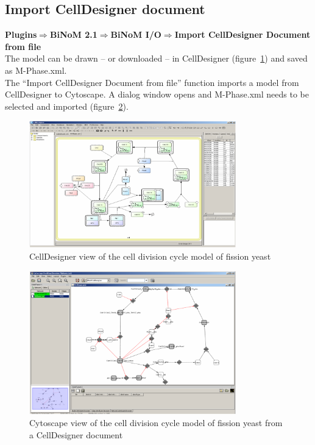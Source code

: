 \subsection{Import CellDesigner document}
\textbf{Plugins$\Rightarrow$BiNoM 2.1$\Rightarrow$BiNoM I/O$\Rightarrow$Import CellDesigner Document from file}\\
The model can be drawn – or downloaded\cite{novak1998model} – in CellDesigner (figure~\ref{CellDesigner_view_of_yeast_cell_division}) and saved as M-Phase.xml.\\
The “Import CellDesigner Document from file” function imports a model from CellDesigner to Cytoscape.  A dialog window opens and M-Phase.xml needs to be selected and imported (figure~\ref{Cytoscape_view_of_yeast_cell_division}).\\
\begin{figure}
\centering
\includegraphics[width=0.8\textwidth]{graphics/CellDesigner_view_of_yeast_cell_division}
\caption{CellDesigner view of the cell division cycle model of fission yeast\cite{novak1998model}}
\label{CellDesigner_view_of_yeast_cell_division}
\end{figure}\begin{figure}
\centering
\includegraphics[width=0.8\textwidth]{graphics/Cytoscape_view_of_yeast_cell_division}
\caption{Cytoscape view of the cell division cycle model of fission yeast from a CellDesigner document}
\label{Cytoscape_view_of_yeast_cell_division}
\end{figure}
